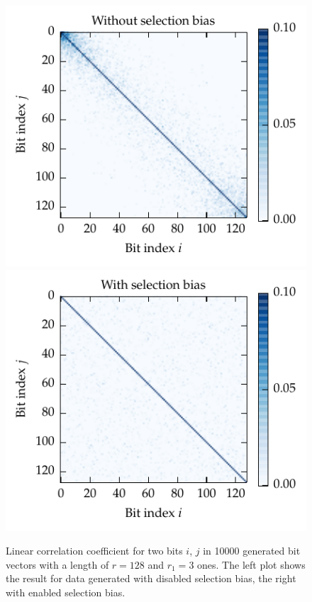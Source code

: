 \begin{figure}[p]
	\centering%
	\includegraphics[trim=0.25cm 0cm 1.4cm 0cm, clip]{media/chp3/balanced_no_bias.pdf}%
	\includegraphics[trim=1.25cm 0cm 0cm 0cm, clip]{media/chp3/balanced_with_bias.pdf}%
	\caption[Linear correlation coefficient with and without index selection bias]{Linear correlation coefficient for two bits $i$, $j$ in 10000 generated bit vectors with a length of $r = 128$ and $r_1 = 3$ ones. The left plot shows the result for data generated with disabled selection bias, the right with enabled selection bias.}
	\label{fig:balanced_bias}
\end{figure}
